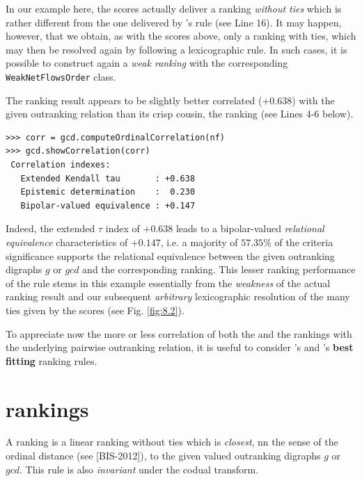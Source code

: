 In our example here, the \NetFlows scores actually deliver a ranking \emph{without ties} which is rather different from the one delivered by \Copeland 's rule (see Line 16). It may happen, however, that we obtain, as with the \Copeland scores above, only a ranking with ties, which may then be resolved again by following a lexicographic rule. In such cases, it is possible to construct again a \emph{weak ranking} with the corresponding \texttt{WeakNetFlowsOrder} class.

The \NetFlows ranking result appears to be slightly better correlated ($+0.638$) with the given outranking relation than its crisp cousin, the \Copeland ranking (see Lines 4-6 below).

\begin{lstlisting}[caption={Checking the quality of the \NetFlows Ranking},label=list:8.6]   
>>> corr = gcd.computeOrdinalCorrelation(nf)
>>> gcd.showCorrelation(corr)
 Correlation indexes:
   Extended Kendall tau       : +0.638
   Epistemic determination    :  0.230
   Bipolar-valued equivalence : +0.147
\end{lstlisting}

Indeed, the extended \Kendall $\tau$ index of $+0.638$ leads to a bipolar-valued \emph{relational equivalence} characteristics of $+0.147$, i.e. a majority of $57.35\%$ of the criteria significance supports the relational equivalence between the given outranking digraphs $g$ or $gcd$  and the corresponding \NetFlows ranking. This lesser ranking performance of the \Copeland rule stems in this example essentially from the \emph{weakness} of the actual ranking result and our subsequent \emph{arbitrary} lexicographic resolution of the many ties given by the \Copeland scores (see Fig. \ref{fig:8.2}).

To appreciate now the more or less correlation of both the \Copeland and the \NetFlows rankings with the underlying pairwise outranking relation, it is useful to consider \Kemeny 's and \Slater 's \textbf{best fitting} ranking rules.

\section{\Kemeny rankings}
\label{sec:8.4}

A \Kemeny ranking is a linear ranking without ties which is \emph{closest}, nn the sense of the ordinal \Kendall distance (see [BIS-2012]), to the given valued outranking digraphs $g$ or $gcd$. This rule is also \emph{invariant} under the codual transform. 

